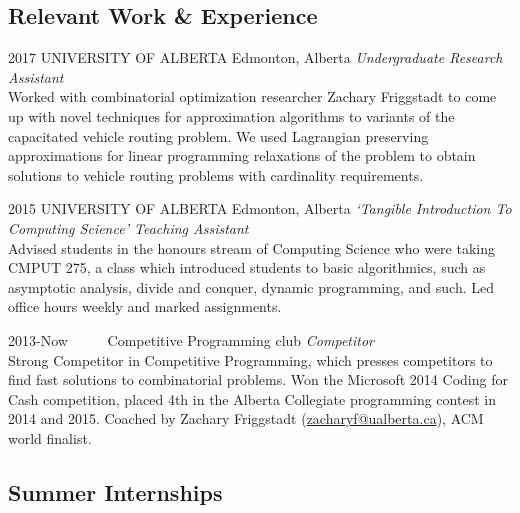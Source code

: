\documentclass{friggeri-cv} %
\begin{document}
\pagebreak[2]
\subsection{Relevant Work \& Experience}

\begin{entrylist}

\entry
{2017}
{UNIVERSITY OF ALBERTA}
{Edmonton, Alberta}
{\emph{Undergraduate Research Assistant} \\
Worked with combinatorial optimization researcher Zachary Friggstadt to come up with novel techniques for approximation algorithms to variants of the capacitated vehicle routing problem. We used Lagrangian preserving approximations for linear programming relaxations of the problem to obtain solutions to vehicle routing problems with cardinality requirements.}

\entry
{2015}
{UNIVERSITY OF ALBERTA}
{Edmonton, Alberta}
{\emph{`Tangible Introduction To Computing Science' Teaching Assistant} \\
Advised students in the honours stream of Computing Science who were taking CMPUT 275, a class which introduced students to basic algorithmics, such as asymptotic analysis, divide and conquer, dynamic programming, and such. Led office hours weekly and marked assignments.}


\entry
{2013-Now\ \ \ \ \ }
{Competitive Programming club}
{}
{\emph{Competitor} \\
Strong Competitor in Competitive Programming, which presses competitors to find fast solutions to combinatorial problems. Won the Microsoft 2014 Coding for Cash competition, placed 4th in the Alberta Collegiate programming contest in 2014 and 2015. Coached by Zachary Friggstadt (\href{mailto:zacharyf@ualberta.ca}{zacharyf@ualberta.ca}), ACM world finalist.}

\end{entrylist}

\pagebreak[4]
\subsection{Summer Internships}
\end{document}
